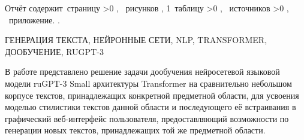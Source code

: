 \Referat

Отчёт содержит \pageref{LastPage}\,страницу%
\ifnum \totfig >0
, \totfig~рисунков%
\fi
, 1~таблицу%
%
\ifnum \totbib >0
, \totbib~источников%
\fi
%
\ifnum \totapp >0
, \totapp~приложение.%
\else
.%
\fi

ГЕНЕРАЦИЯ ТЕКСТА, НЕЙРОННЫЕ СЕТИ, NLP, TRANSFORMER, ДООБУЧЕНИЕ, RUGPT-3

В работе представлено решение задачи дообучения нейросетевой языковой модели ruGPT-3 Small архитектуры Transformer на сравнительно небольшом корпусе текстов, принадлежащих конкретной предметной области, для усвоения моделью стилистики текстов данной области и последующего её встраивания в графический веб-интерфейс пользователя, предоставляющий возможности по генерации новых текстов, принадлежащих той же предметной области.
